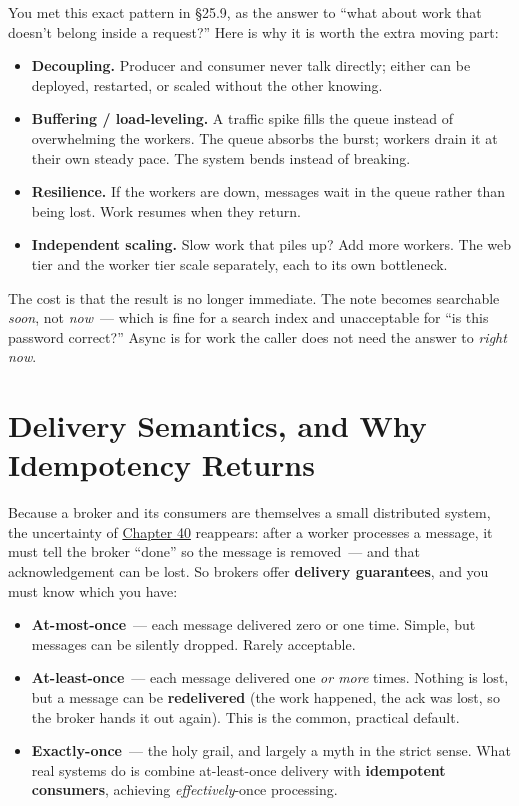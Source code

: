 \noindent{}You met this exact pattern in §25.9, as the answer to ``what about work that doesn't belong inside a request?'' Here is why it is worth the extra moving part:

\begin{itemize}
\tightlist
\item
  \textbf{Decoupling.} Producer and consumer never talk directly; either can be deployed, restarted, or scaled without the other knowing.
\item
  \textbf{Buffering / load-leveling.} A traffic spike fills the queue instead of overwhelming the workers. The queue absorbs the burst; workers drain it at their own steady pace. The system bends instead of breaking.
\item
  \textbf{Resilience.} If the workers are down, messages wait in the queue rather than being lost. Work resumes when they return.
\item
  \textbf{Independent scaling.} Slow work that piles up? Add more workers. The web tier and the worker tier scale separately, each to its own bottleneck.
\end{itemize}

\noindent{}The cost is that the result is no longer immediate. The note becomes searchable \emph{soon}, not \emph{now}~--- which is fine for a search index and unacceptable for ``is this password correct?'' Async is for work the caller does not need the answer to \emph{right now}.

\setcounter{section}{2}
\section{Delivery Semantics, and Why Idempotency Returns}\label{41-event-driven-architecture:413-delivery-semantics-and-why-idempotency-returns}

Because a broker and its consumers are themselves a small distributed system, the uncertainty of \hyperref[ch:40-distributed-systems]{Chapter 40} reappears: after a worker processes a message, it must tell the broker ``done'' so the message is removed~--- and that acknowledgement can be lost. So brokers offer \textbf{delivery guarantees}, and you must know which you have:

\begin{itemize}
\tightlist
\item
  \textbf{At-most-once}~--- each message delivered zero or one time. Simple, but messages can be silently dropped. Rarely acceptable.
\item
  \textbf{At-least-once}~--- each message delivered one \emph{or more} times. Nothing is lost, but a message can be \textbf{redelivered} (the work happened, the ack was lost, so the broker hands it out again). This is the common, practical default.
\item
  \textbf{Exactly-once}~--- the holy grail, and largely a myth in the strict sense. What real systems do is combine at-least-once delivery with \textbf{idempotent consumers}, achieving \emph{effectively}-once processing.
\end{itemize}


